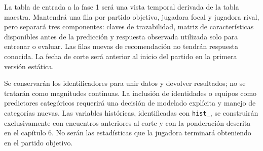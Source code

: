 La tabla de entrada a la fase 1 será una vista temporal derivada de la tabla maestra. Mantendrá una fila por partido objetivo, jugadora focal y jugadora rival, pero separará tres componentes: claves de trazabilidad, matriz de características disponibles antes de la predicción y respuesta observada utilizada solo para entrenar o evaluar. Las filas nuevas de recomendación no tendrán respuesta conocida. La fecha de corte será anterior al inicio del partido en la primera versión estática.

Se conservarán los identificadores para unir datos y devolver resultados; no se tratarán como magnitudes continuas. La inclusión de identidades o equipos como predictores categóricos requerirá una decisión de modelado explícita y manejo de categorías nuevas. Las variables históricas, identificadas con \texttt{hist\_}, se construirán exclusivamente con encuentros anteriores al corte y con la ponderación descrita en el capítulo 6. No serán las estadísticas que la jugadora terminará obteniendo en el partido objetivo.

